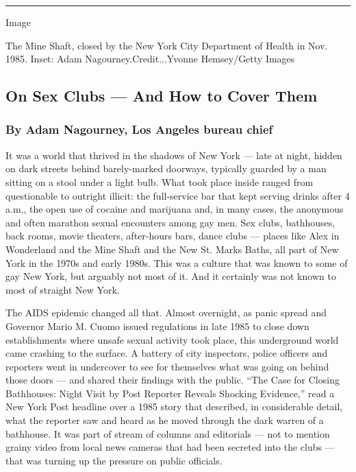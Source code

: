 \begin{center}\rule{0.5\linewidth}{\linethickness}\end{center}

Image

The Mine Shaft, closed by the New York City Department of Health in Nov.
1985. Inset: Adam Nagourney.Credit...Yvonne Hemsey/Getty Images

\hypertarget{on-sex-clubs--and-how-to-cover-them}{%
\subsection{On Sex Clubs --- And How to Cover
Them}\label{on-sex-clubs--and-how-to-cover-them}}

\hypertarget{by-adam-nagourney-los-angeles-bureau-chief}{%
\subsubsection{By Adam Nagourney, Los Angeles bureau
chief}\label{by-adam-nagourney-los-angeles-bureau-chief}}

It was a world that thrived in the shadows of New York --- late at
night, hidden on dark streets behind barely-marked doorways, typically
guarded by a man sitting on a stool under a light bulb. What took place
inside ranged from questionable to outright illicit: the full-service
bar that kept serving drinks after 4 a.m., the open use of cocaine and
marijuana and, in many cases, the anonymous and often marathon sexual
encounters among gay men. Sex clubs, bathhouses, back rooms, movie
theaters, after-hours bars, dance clubs --- places like Alex in
Wonderland and the Mine Shaft and the New St. Marks Baths, all part of
New York in the 1970s and early 1980s. This was a culture that was known
to some of gay New York, but arguably not most of it. And it certainly
was not known to most of straight New York.

The AIDS epidemic changed all that. Almost overnight, as panic spread
and Governor Mario M. Cuomo issued regulations in late 1985 to close
down establishments where unsafe sexual activity took place, this
underground world came crashing to the surface. A battery of city
inspectors, police officers and reporters went in undercover to see for
themselves what was going on behind those doors --- and shared their
findings with the public. ``The Case for Closing Bathhouses: Night Visit
by Post Reporter Reveals Shocking Evidence,'' read a New York Post
headline over a 1985 story that described, in considerable detail, what
the reporter saw and heard as he moved through the dark warren of a
bathhouse. It was part of stream of columns and editorials --- not to
mention grainy video from local news cameras that had been secreted into
the clubs --- that was turning up the pressure on public officials.


